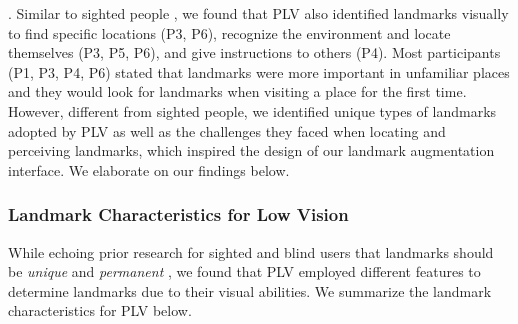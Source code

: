 . Similar to sighted people \cite{downs2011cognitive,klippel2005structural, tom2003referring, lovelace1999elements}, we found that PLV also identified landmarks visually to find specific locations (P3, P6), recognize the environment and locate themselves (P3, P5, P6), and give instructions to others (P4). Most participants (P1, P3, P4, P6) stated that landmarks were more important in unfamiliar places and they would look for landmarks when visiting a place for the first time. However, different from sighted people, we identified unique types of landmarks adopted by PLV as well as the challenges they faced when locating and perceiving landmarks, which inspired the design of our landmark augmentation interface. We elaborate on our findings below.


\subsubsection{Landmark Characteristics for Low Vision}\label{Landmark Characteristics for Low Vision}
While echoing prior research for sighted and blind users that landmarks should be \textit{unique} and \textit{permanent} \cite{yesiltepe2021landmarks,wang2023understanding}, we found that PLV employed different features to determine landmarks due to their visual abilities. We summarize the landmark characteristics for PLV below.

